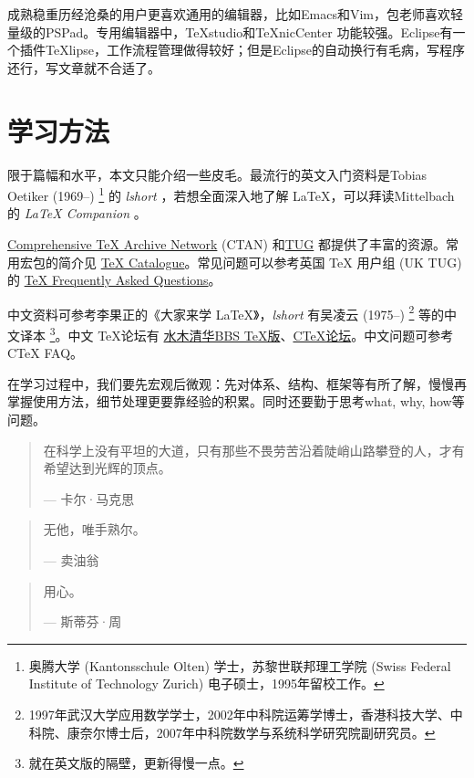 成熟稳重历经沧桑的用户更喜欢通用的编辑器，比如Emacs和Vim，包老师喜欢轻量级的PSPad。专用编辑器中，TeXstudio和TeXnicCenter 功能较强。Eclipse有一个插件TeXlipse，工作流程管理做得较好；但是Eclipse的自动换行有毛病，写程序还行，写文章就不合适了。

\section{学习方法}

限于篇幅和水平，本文只能介绍一些皮毛。最流行的英文入门资料是Tobias Oetiker (1969--)\indexOetiker{} \footnote{奥腾大学 (Kantonsschule Olten) 学士，苏黎世联邦理工学院 (Swiss Federal Institute of Technology Zurich) 电子硕士，1995年留校工作。} 的 \emph{lshort} \citep{Oetiker_2008}，若想全面深入地了解 \LaTeX ，可以拜读Mittelbach的 \emph{\LaTeX{} Companion} \citep{Mittelbach_2004}。

\href{http://www.ctan.org/}{Comprehensive TeX Archive Network} (CTAN) 和\href{http://www.tug.org/}{TUG} 都提供了丰富的资源。常用宏包的简介见 \href{http://www.ctan.org/tex-archive/help/Catalogue/catalogue.html}{TeX Catalogue}。常见问题可以参考英国 TeX 用户组 (UK TUG) 的 \href{http://www.tex.ac.uk/faq/}{TeX Frequently Asked Questions}。

中文资料可参考李果正\indexLee 的《大家来学 \LaTeX 》\citep{Lee_2004}，\emph{lshort} 有吴凌云 (1975--)\indexWuLingyun{} \footnote{1997年武汉大学应用数学学士，2002年中科院\indexCAS 运筹学博士，香港科技大学、中科院、康奈尔博士后，2007年中科院数学与系统科学研究院副研究员。} 等的中文译本 \footnote{就在英文版的隔壁，更新得慢一点。}。中文 \TeX 论坛有 \href{http://www.smth.org/bbsdoc.php?board=TeX}{水木清华BBS TeX版}、\href{http://bbs.ctex.org/}{CTeX论坛}。中文问题可参考 CTeX FAQ\citep{CTeX_FAQ}。

在学习过程中，我们要先宏观后微观：先对体系、结构、框架等有所了解，慢慢再掌握使用方法，细节处理更要靠经验的积累。同时还要勤于思考what, why, how等问题。

\begin{quotation}
在科学上没有平坦的大道，只有那些不畏劳苦沿着陡峭山路攀登的人，才有希望达到光辉的顶点。
\begin{flushright}
--- 卡尔·马克思
\end{flushright}
\end{quotation}

\begin{quotation}
无他，唯手熟尔。
\begin{flushright}
--- 卖油翁
\end{flushright}
\end{quotation}

\begin{quotation}
用心。
\begin{flushright}
--- 斯蒂芬·周
\end{flushright}
\end{quotation}



